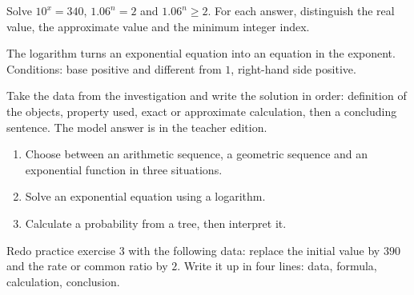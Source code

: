 \begin{activite}
Solve $10^x=340$, $1.06^n=2$ and $1.06^n\geq2$. For each answer, distinguish the real value, the approximate value and the minimum integer index.

\end{activite}

\begin{traceecrite}The logarithm turns an exponential equation into an equation in the exponent. Conditions: base positive and different from $1$, right-hand side positive.\end{traceecrite}

\begin{exemple}
Take the data from the investigation and write the solution in order: definition of the objects, property used, exact or approximate calculation, then a concluding sentence. The model answer is in the teacher edition.
\end{exemple}

\begin{exercice}[-- essentiel]
\begin{enumerate}\item Choose between an arithmetic sequence, a geometric sequence and an exponential function in three situations.\item Solve an exponential equation using a logarithm.\item Calculate a probability from a tree, then interpret it.\end{enumerate}
\end{exercice}


\begin{dm}Redo practice exercise 3 with the following data: replace the initial value by $390$ and the rate or common ratio by $2$. Write it up in four lines: data, formula, calculation, conclusion.\end{dm}

